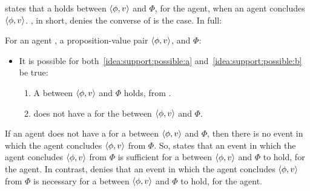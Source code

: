\begin{note}
  \supportI{} states that a \ros{} holds between \(\langle \phi, v \rangle\) and \(\Phi\), for the agent, when an agent concludes \(\langle \phi, v \rangle\).
  \supportII{}, in short, denies the converse of \supportI{} is the case.
  In full:

  \begin{idea}[\supportII{}]
    \label{idea:support:possible}
    For an agent \vAgent{}, a proposition-value pair \(\langle \phi, v \rangle\), and \poP{} \(\Phi\):

    \begin{itemize}
    \item
      It is possible for both~\ref{idea:support:possible:a} and~\ref{idea:support:possible:b} be true:
      \begin{enumerate}[label=\alph*., ref=(\alph*)]
      \item
        \label{idea:support:possible:a}
        A \ros{} between \(\langle \phi, v \rangle\) and \(\Phi\) holds, from .
      \item
        \label{idea:support:possible:b}
        \vAgent{} does not have a \wit{} for the \ros{} between \(\langle \phi, v \rangle\) and \(\Phi\).
      \end{enumerate}
    \end{itemize}
    \vspace{-\baselineskip}
  \end{idea}

  If an agent does not have a \wit{} for a \ros{} between \(\langle \phi, v \rangle\) and \(\Phi\), then there is no event in which the agent concludes \(\langle \phi, v \rangle\) from \(\Phi\).
  So, \supportI{} states that an event in which the agent concludes \(\langle \phi, v \rangle\) from \(\Phi\) is sufficient for a \ros{} between \(\langle \phi, v \rangle\) and \(\Phi\) to hold, for the agent.
  In contrast, \supportII{} denies that an event in which the agent concludes \(\langle \phi, v \rangle\) from \(\Phi\) is necessary for a \ros{} between \(\langle \phi, v \rangle\) and \(\Phi\) to hold, for the agent.
\end{note}

